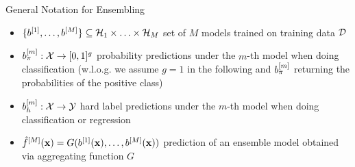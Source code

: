 \documentclass[10pt,compress,t,notes=noshow, xcolor=table]{beamer}
\begin{document}

\begin{vbframe}{General Notation for Ensembling}
\vfill
\begin{itemize}
    \item $\{b^{[1]}, \ldots, b^{[M]}\} \subseteq \mathcal{H}_{1} \times \ldots \times \mathcal{H}_{M}$ set of $M$ models trained on training data $\mathcal{D}$
    \item $b_{\pi}^{[m]}: \mathcal{X} \rightarrow [0, 1]^{g}$ probability predictions under the $m$-th model when doing classification (w.l.o.g. we assume $g = 1$ in the following and $b_{\pi}^{[m]}$ returning the probabilities of the positive class)
    \item $b_{h}^{[m]}: \mathcal{X} \rightarrow \mathcal{Y}$ hard label predictions under the $m$-th model when doing classification or regression
    \item $\hat{f}^{[M]}(\mathbf{x}) = G(b^{[1]}(\mathbf{x}), \ldots, b^{[M]}(\mathbf{x}))$ prediction of an ensemble model obtained via aggregating function $G$
\end{itemize}
\vfill
\end{vbframe}
\end{document}
